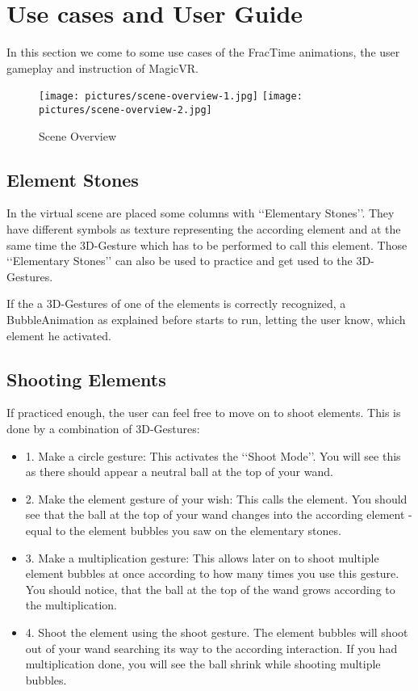 \section{Use cases and User Guide}
In this section we come to some use cases of the FracTime animations, the user gameplay and instruction of MagicVR.

\begin{figure}[!ht]
\texttt{[image: pictures/scene-overview-1.jpg]}
\texttt{[image: pictures/scene-overview-2.jpg]}
\caption{Scene Overview}
\end{figure}

\subsection{Element Stones}
In the virtual scene are placed some columns with \lq\lq{}Elementary Stones\rq\rq{}. They have different symbols as texture representing the according element and at the same time the 3D-Gesture which has to be performed to call this element. Those \lq\lq{}Elementary Stones\rq\rq{} can also be used to practice and get used to the 3D-Gestures.

If the a 3D-Gestures of one of the elements is correctly recognized, a BubbleAnimation as explained before starts to run, letting the user know, which element he activated.

\subsection{Shooting Elements}
If practiced enough, the user can feel free to move on to shoot elements. This is done by a combination of 3D-Gestures:
\begin{itemize}
\item{1.} Make a circle gesture: This activates the \lq\lq{}Shoot Mode\rq\rq{}. You will see this as there should appear a neutral ball at the top of your wand.
\item{2.} Make the element gesture of your wish: This calls the element. You should see that the ball at the top of your wand changes into the according element - equal to the element bubbles you saw on the elementary stones.
\item{3.} Make a multiplication gesture: This allows later on to shoot multiple element bubbles at once according to how many times you use this gesture. You should notice, that the ball at the top of the wand grows according to the multiplication.
\item{4.} Shoot the element using the shoot gesture. The element bubbles will shoot out of your wand searching its way to the according interaction. If you had multiplication done, you will see the ball shrink while shooting multiple bubbles.
\end{itemize}

